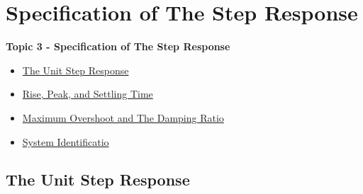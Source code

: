 \documentclass[fleqn]{beamer} %
\newcommand{\sectionIVtitle}{Specification of The Step Response}
\newcommand{\sectionIVsubsectionItitle}{The Unit Step Response}
\newcommand{\sectionIVsubsectionIItitle}{Rise, Peak, and Settling Time}
\newcommand{\sectionIVsubsectionIIItitle}{Maximum Overshoot and The Damping Ratio}
\newcommand{\sectionIVsubsectionIVtitle}{System Identificatio}
\begin{document}
	\section{\sectionIVtitle}\label{sectionIV}

		\begin{frame}
			\large \textbf{Topic 3 - \sectionIVtitle} \vspace{3mm}\\

			\begin{itemize}
				\item \hyperlink{sectionIVsubsectionI}{\sectionIVsubsectionItitle} \vspc %
				\item \hyperlink{sectionIVsubsectionII}{\sectionIVsubsectionIItitle} \vspc %
				\item \hyperlink{sectionIVsubsectionIII}{\sectionIVsubsectionIIItitle} \vspc %
				\item \hyperlink{sectionIVsubsectionIV}{\sectionIVsubsectionIVtitle} \vspc %

			\end{itemize}

		\end{frame}

		\subsection{\sectionIVsubsectionItitle}\label{sectionIVsubsectionI}
\end{document}
